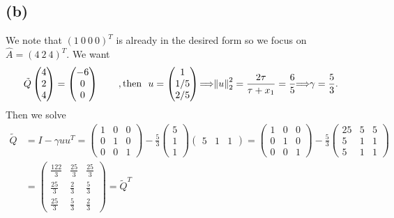 \documentclass[12pt]{article}
\let\oldimplies\implies
\renewcommand*{\implies}{
	\hspace{-0.05cm}\resizebox{.95\width}{\height}{$\oldimplies$}\hspace{-0.05cm}
}
\begin{document}
		\subsection*{(b)}
			We note that $(1 \ 0  \ 0\  0)^{T}$ is already in the desired form so we focus on $\hat{A} = (4 \  2  \ 4)^{T}$. We want
			\begin{gather*}
				\tilde{Q} \begin{pmatrix}
					4 \\ 2 \\4 
				\end{pmatrix} = \begin{pmatrix}
				-6 \\ 0 \\ 0
				\end{pmatrix}
				\qquad , \text{then }\ u = \begin{pmatrix}
					1 \\ 1/5 \\ 2 /5
				\end{pmatrix}
				 \implies \norm{u}_{2}^{2} = \frac{2 \tau}{\tau + x_1} = \frac65 \implies \gamma = \frac53.
			\end{gather*}
			Then we solve 
			\begin{align*}
				\tilde{Q} &= I - \gamma u u^{T} =\begin{pmatrix}
					1 & 0 & 0 \\
					0 & 1 & 0 \\
					0 & 0 & 1 
				\end{pmatrix} - \frac53 \begin{pmatrix}
					5 \\ 1 \\ 1
				\end{pmatrix}
				\begin{pmatrix}
				 5&1&1
				\end{pmatrix} = 
				\begin{pmatrix}
				1 & 0 & 0 \\
				0 & 1 & 0 \\
				0 & 0 & 1 
				\end{pmatrix} - \frac53 \begin{pmatrix}
				25 & 5 & 5 \\
				5 & 1 & 1 \\
				5 & 1 & 1
				\end{pmatrix}
				 \\ &= \begin{pmatrix}
				\frac{122}{3} & \frac{25}{3} & \frac{25}{3}\\
				\frac{25}{3} & \frac23 & \frac53 \\
				\frac{25}{3} & \frac53 & \frac23 
				\end{pmatrix} = \tilde{Q}^{T}
			\end{align*}
\end{document}
